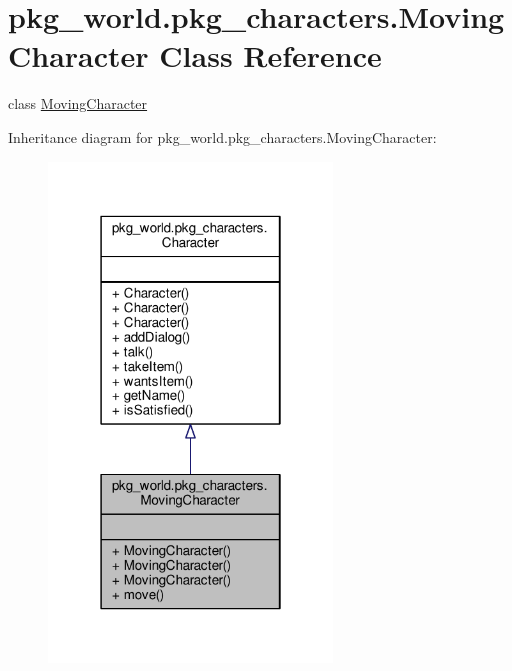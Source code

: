\hypertarget{classpkg__world_1_1pkg__characters_1_1MovingCharacter}{\section{pkg\-\_\-world.\-pkg\-\_\-characters.\-Moving\-Character Class Reference}
\label{classpkg__world_1_1pkg__characters_1_1MovingCharacter}
}


class \hyperlink{classpkg__world_1_1pkg__characters_1_1MovingCharacter}{Moving\-Character}  




Inheritance diagram for pkg\-\_\-world.\-pkg\-\_\-characters.\-Moving\-Character\-:\nopagebreak
\begin{figure}[H]
\begin{center}
\leavevmode
\includegraphics[width=214pt]{classpkg__world_1_1pkg__characters_1_1MovingCharacter__inherit__graph}
\end{center}
\end{figure}


